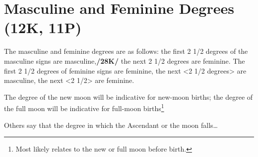\section{Masculine and Feminine Degrees (12K, 11P)}
The masculine and feminine degrees are as follows: the first 2 1/2 degrees of the masculine signs are masculine,\textbf{/28K/} the next 2 1/2 degrees are feminine. The first 2 1/2 degrees of feminine signs are feminine, the next <2 1/2 degrees> are masculine, the next <2 1/2> are feminine. 

\mndl[0.2cm]
The degree of the new moon will be indicative for new-moon births; the degree of the full moon will be indicative for full-moon births\footnote{Most likely relates to the new or full moon before birth.} 

Others say that the degree in which the Ascendant or the moon falls\ldots

\newpage
